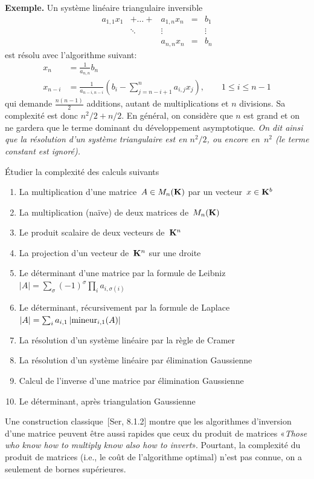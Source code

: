 {\bf Exemple.}
Un système linéaire triangulaire inversible
\[
\begin{array}{ccccc}
a_{1,1}x_1  & + \ldots +  & a_{1,n}x_n & = & b_1 \\
& \ddots & \vdots && \vdots \\
&& a_{n,n}x_n & =&  b_n
\end{array}
\]
est résolu avec l'algorithme suivant:
\begin{align*}
x_n & = \frac{1}{a_{n,n}}b_n \\
x_{n-i} & = \frac{1}{a_{n-i,n-i}}\left(
b_i - \sum_{j=n-i+1}^{n} a_{i,j}x_j
\right), \qquad 1 \leq i \leq n-1
\end{align*}
qui demande $\frac{n(n-1)}{2}$ additions, autant de multiplications et $n$
divisions. Sa complexité est donc ${n^2}/{2} + n/2$. En général, on considère
que $n$ est grand et on ne gardera que le terme dominant du développement
asymptotique.
\emph{On dit ainsi que la résolution d'un système triangulaire est en
$n^2/2$, ou encore en~$n^2$ (le terme constant est ignoré).}

\begin{exercice}Étudier la complexité des calculs suivants
	\begin{enumerate}
		\item La multiplication d'une matrice~$A\in M_n(\mathbf{K})$ par un
			vecteur~$x\in\mathbf{K}^b$
		\item La multiplication (naïve) de deux matrices de~$M_n(\mathbf{K})$
		\item Le produit scalaire de deux vecteurs de~$\mathbf{K}^n$
		\item La projection d'un vecteur de~$\mathbf{K}^n$ sur une droite
		\item Le déterminant d'une matrice par la formule de
			Leibniz~$|A|=\sum_\sigma(-1)^\sigma\prod_i a_{i,\sigma(i)}$
		\item Le déterminant, récursivement par la formule de
			Laplace~$\left|A\right|=\sum_ia_{i,1}\left|\mathrm{mineur}_{i,1}(A)\right|$
		\item La résolution d'un système linéaire par la règle de Cramer
		\item La résolution d'un système linéaire par élimination Gaussienne
		\item Calcul de l'inverse d'une matrice par élimination Gaussienne
		\item Le déterminant, après triangulation Gaussienne
	\end{enumerate}
\end{exercice}

Une construction classique~[Ser, 8.1.2] montre que les algorithmes
d'inversion d'une matrice peuvent être aussi rapides que ceux du produit de
matrices «\emph{Those who know how to multiply know also how to invert}».
Pourtant, la complexité du produit de matrices (i.e., le coût de l'algorithme
optimal) n'est pas connue, on a seulement de bornes supérieures.

